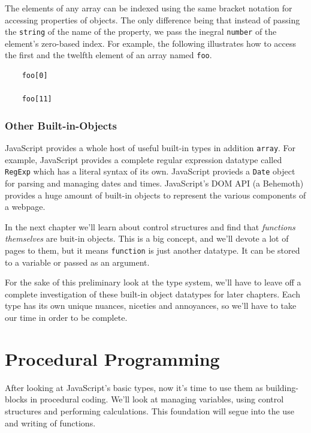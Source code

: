 \documentclass[11pt,letter]{book}
\begin{document}
    The elements of any array can be indexed using the same bracket notation for accessing 
    properties of objects. The only difference being that instead of passing the \texttt{string} of 
    the name of the property, we pass the inegral \texttt{number} of the element's zero-based index.
    For example, the following illustrates how to access the first and the twelfth element of an 
    array named \texttt{foo}.
    
    \begin{verbatim}
    foo[0]
    
    foo[11]
    \end{verbatim}
    
    \subsection{Other Built-in-Objects}
    JavaScript provides a whole host of useful built-in types in addition \texttt{array}. For 
    example, JavaScript provides a complete regular expression datatype called \texttt{RegExp} which
    has a literal syntax of its own. JavaScript provieds a \texttt{Date} object for parsing and 
    managing dates and times. JavaScript's DOM API (a Behemoth) provides a huge amount of built-in 
    objects to represent the various components of a webpage.
    
    In the next chapter we'll learn about control structures and find that \emph{functions 
    themselves} are buit-in objects. This is a big concept, and we'll devote a lot of pages to them,
    but it means \texttt{function} is just another datatype. It can be stored to a variable or 
    passed as an argument.
    
    For the sake of this preliminary look at the type system, we'll have to leave off a complete 
    investigation of these built-in object datatypes for later chapters. Each type has its own 
    unique nuances, niceties and annoyances, so we'll have to take our time in order to be complete.
    
    \chapter{Procedural Programming}
    After looking at JavaScript's basic types, now it's time to use them as building-blocks in 
    procedural coding. We'll look at managing variables, using control structures and performing 
    calculations. This foundation will segue into the use and writing of functions.
    
\end{document}
